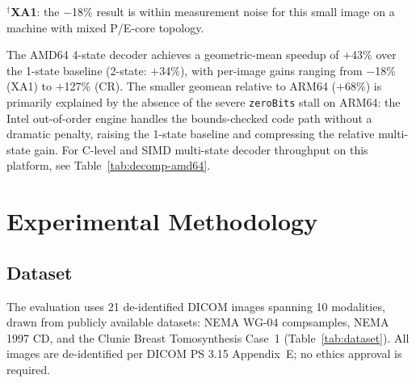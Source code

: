 \documentclass[journal]{IEEEtran}
\begin{document}
$^\dagger$\textbf{XA1}: the $-$18\% result is within measurement noise for
this small image on a machine with mixed P/E-core topology.

The AMD64 4-state decoder achieves a geometric-mean speedup of $+$43\%
over the 1-state baseline (2-state: $+$34\%), with per-image gains
ranging from $-$18\% (XA1) to $+$127\% (CR). The smaller geomean
relative to ARM64 ($+$68\%) is primarily explained by the absence of
the severe \texttt{zeroBits} stall on ARM64: the Intel out-of-order
engine handles the bounds-checked code path without a dramatic penalty,
raising the 1-state baseline and compressing the relative multi-state
gain. For C-level and SIMD multi-state decoder throughput on this
platform, see Table~\ref{tab:decomp-amd64}.

\section{Experimental Methodology}
\label{sec:methodology}

\subsection{Dataset}

The evaluation uses 21 de-identified DICOM images spanning 10 modalities, drawn
from publicly available datasets: NEMA WG-04 compsamples, NEMA 1997 CD, and the
Clunie Breast Tomosynthesis Case~1 (Table~\ref{tab:dataset}). All images are
de-identified per DICOM PS 3.15 Appendix~E; no ethics approval is required.
\end{document}
